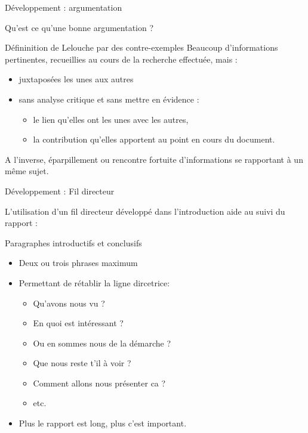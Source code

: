 \documentclass[french]{beamer}
\begin{document}
\begin{frame}{Développement : argumentation}

Qu'est ce qu'une bonne argumentation ?

\begin{block}{Défininition de Lelouche par des contre-exemples}
	Beaucoup d'informations pertinentes, recueillies au cours de la recherche effectuée, mais :
	\begin{itemize}
		\item juxtaposées les unes aux autres
		\item sans analyse critique et sans mettre en évidence :
		\begin{itemize}
			\item le lien qu'elles ont les unes avec les autres,
			\item la contribution qu'elles apportent au point en cours du document.
		\end{itemize}
	\end{itemize}
	A l'inverse, éparpillement ou rencontre fortuite d'informations se rapportant à un même sujet.
\end{block}
\end{frame}

\begin{frame}{Développement : Fil directeur}

L'utilisation d'un fil directeur développé dans l'introduction aide au suivi du rapport : 

\begin{block}{Paragraphes introductifs et conclusifs}
	\begin{itemize}
		\item Deux ou trois phrases maximum
		\item Permettant de rétablir la ligne dircetrice:
		\begin{itemize}
			\item Qu'avons nous vu ?
			\item En quoi est intéressant ?
			\item Ou en sommes nous de la démarche ?
			\item Que nous reste t'il à voir ? 
			\item Comment allons nous présenter ca ?
			\item etc.
		\end{itemize}
		\item Plus le rapport est long, plus c'est important.
	\end{itemize}
\end{block}
\end{frame}
\end{document}
